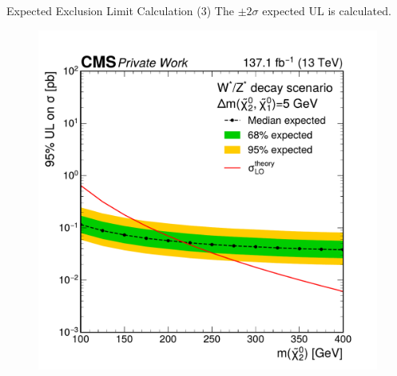 \begin{frame}[fragile]{Expected Exclusion Limit Calculation (3)}
  The \(\pm2\sigma\) expected UL is calculated.
  	\begin{figure}[htpb]
  	  \centering
  	  \includegraphics[height=0.6\textheight]{fig/limit-example/step-3.pdf}
  	\end{figure}
\end{frame}

